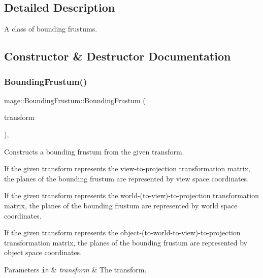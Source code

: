\subsection{Detailed Description}
A class of bounding frustums. 

\subsection{Constructor \& Destructor Documentation}
\mbox{\label{classmage_1_1_bounding_frustum_afafc5433abc80e872242b5488ca0c835}} 
\subsubsection{\texorpdfstring{Bounding\+Frustum()}{BoundingFrustum()}\hspace{0.1cm}{\footnotesize\ttfamily [1/3]}}
{\footnotesize\ttfamily mage\+::\+Bounding\+Frustum\+::\+Bounding\+Frustum (\begin{DoxyParamCaption}\item[{C\+X\+M\+M\+A\+T\+R\+IX}]{transform }\end{DoxyParamCaption})\hspace{0.3cm}{\ttfamily [explicit]}, {\ttfamily [noexcept]}}

Constructs a bounding frustum from the given transform.

If the given transform represents the view-\/to-\/projection transformation matrix, the planes of the bounding frustum are represented by view space coordinates.

If the given transform represents the world-\/(to-\/view)-\/to-\/projection transformation matrix, the planes of the bounding frustum are represented by world space coordinates.

If the given transform represents the object-\/(to-\/world-\/to-\/view)-\/to-\/projection transformation matrix, the planes of the bounding frustum are represented by object space coordinates.


\begin{DoxyParams}[1]{Parameters}
\mbox{\tt in}  & {\em transform} & The transform. \\
\hline
\end{DoxyParams}
\mbox{\label{classmage_1_1_bounding_frustum_a22233ec36a176312dd453bbab682c313}} 
